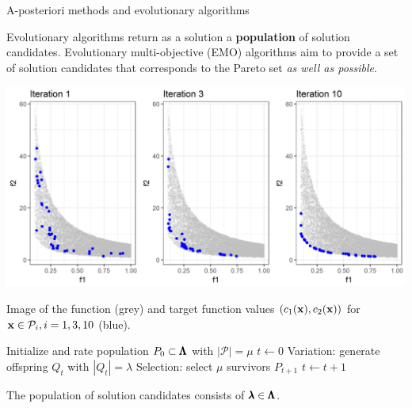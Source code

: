 \begin{frame}[allowframebreaks]{A-posteriori methods and evolutionary algorithms}

Evolutionary algorithms return as a solution a \textbf{population} of solution candidates. Evolutionary multi-objective (EMO) algorithms aim to provide a set of solution candidates that corresponds to the Pareto set \textit{as well as possible}.

\vspace*{-0.4cm}

\begin{center}
\includegraphics[width = 0.7\linewidth]{images/EA-steps.png}
\end{center}

\vspace*{-0.4cm}

\begin{footnotesize}
Image of the function (grey) and target function values $(c_1(\mathbf{x}), c_2(\mathbf{x}))$ for $\mathbf{x} \in \mathcal{P}_i, i = 1, 3, 10$ (blue).
\end{footnotesize}

\framebreak
\begin{algorithm}[H]
  \begin{center}
  \caption{Evolutionary algorithm}
      \begin{algorithmic}[1]
      \STATE Initialize and rate population $P_0 \subset \pmb{\Lambda}$ with $|\mathcal{P}| = \mu$ %
      \STATE $t \leftarrow 0$
      \REPEAT
        \STATE Variation: generate offspring $Q_t$ with $|Q_t| = \lambda$
        \STATE Selection: select $\mu$ survivors $P_{t + 1}$ %
 		\STATE $t \leftarrow t + 1$
     \end{algorithmic}
    \end{center}
\end{algorithm}

The population of solution candidates consists of $\pmb{\lambda} \in \pmb{\Lambda}$. %

\end{frame}


